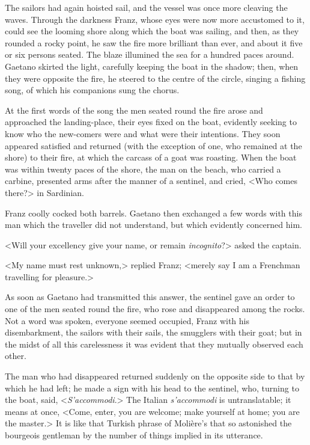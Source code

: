  The sailors had again hoisted sail, and the vessel was once more cleaving the waves. Through the darkness Franz, whose eyes were now more accustomed to it, could see the looming shore along which the boat was sailing, and then, as they rounded a rocky point, he saw the fire more brilliant than ever, and about it five or six persons seated. The blaze illumined the sea for a hundred paces around. Gaetano skirted the light, carefully keeping the boat in the shadow; then, when they were opposite the fire, he steered to the centre of the circle, singing a fishing song, of which his companions sung the chorus. 

 At the first words of the song the men seated round the fire arose and approached the landing-place, their eyes fixed on the boat, evidently seeking to know who the new-comers were and what were their intentions. They soon appeared satisfied and returned (with the exception of one, who remained at the shore) to their fire, at which the carcass of a goat was roasting. When the boat was within twenty paces of the shore, the man on the beach, who carried a carbine, presented arms after the manner of a sentinel, and cried, <Who comes there?> in Sardinian. 

 Franz coolly cocked both barrels. Gaetano then exchanged a few words with this man which the traveller did not understand, but which evidently concerned him. 

 <Will your excellency give your name, or remain \textit{incognito}?> asked the captain. 

 <My name must rest unknown,> replied Franz; <merely say I am a Frenchman travelling for pleasure.> 

 As soon as Gaetano had transmitted this answer, the sentinel gave an order to one of the men seated round the fire, who rose and disappeared among the rocks. Not a word was spoken, everyone seemed occupied, Franz with his disembarkment, the sailors with their sails, the smugglers with their goat; but in the midst of all this carelessness it was evident that they mutually observed each other. 

 The man who had disappeared returned suddenly on the opposite side to that by which he had left; he made a sign with his head to the sentinel, who, turning to the boat, said, <\textit{S'accommodi}.> The Italian \textit{s'accommodi} is untranslatable; it means at once, <Come, enter, you are welcome; make yourself at home; you are the master.> It is like that Turkish phrase of Molière's that so astonished the bourgeois gentleman by the number of things implied in its utterance. 

